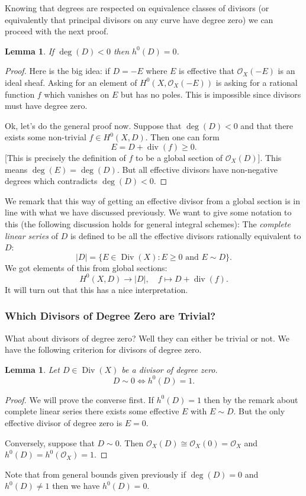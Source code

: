 \documentclass[12pt]{article}
\numberwithin{equation}{section}
\newtheorem{lemma}[theorem]{Lemma}
\theoremstyle{definition}
\theoremstyle{remark}
\newcommand{\Ocal}{\mathcal{O}}
\newcommand{\Div}{\operatorname{Div}}
\renewcommand{\div}{\operatorname{div}}
\begin{document}
Knowing that degrees are respected on equivalence classes of divisors (or equivalently that principal divisors on any curve have degree zero) we can proceed with the next proof. 

\begin{lemma}
	If $\deg(D)<0$ then $h^0(D)=0$. 
\end{lemma}
\begin{proof}
	Here is the big idea: if $D=-E$ where $E$ is effective that $\Ocal_X(-E)$ is an ideal sheaf. 
	Asking for an element of $H^0(X,\Ocal_X(-E))$ is asking for a rational function $f$ which vanishes on $E$ but has no poles. 
	This is impossible since divisors must have degree zero. 
	
	Ok, let's do the general proof now. 
	Suppose that $\deg(D)<0$ and that there exists some non-trivial $f\in H^0(X,D)$. 
	Then one can form 
	 $$ E = D + \div(f) \geq 0.$$
	[This is precisely the definition of $f$ to be a global section of $\Ocal_X(D)$].
	This means $\deg(E) = \deg(D)$. 
	But all effective divisors have non-negative degrees which contradicts $\deg(D)<0$. 
\end{proof}

We remark that this way of getting an effective divisor from a global section is in line with what we have discussed previously. 
We want to give some notation to this (the following discussion holds for general integral schemes):
The \emph{complete linear series} of $D$ is defined to be all the effective divisors rationally equivalent to $D$:
  $$ \vert D \vert = \lbrace E \in \Div(X) \colon E \geq 0 \mbox{ and } E \sim D \rbrace.$$
We got elements of this from global sections:
 $$ H^0(X,D) \to \vert D \vert, \quad f \mapsto D + \div(f). $$
It will turn out that this has a nice interpretation.

\subsubsection{Which Divisors of Degree Zero are Trivial?}
What about divisors of degree zero? Well they can either be trivial or not. 
We have the following criterion for divisors of degree zero. 
\begin{lemma}
	Let $D\in \Div(X)$ be a divisor of degree zero. 
	 $$ D \sim 0 \iff h^0(D) = 1.$$
\end{lemma}
\begin{proof}
	We will prove the converse first. 
	If $h^0(D)=1$ then by the remark about complete linear series there exists some effective $E$ with $E\sim D$. 
	But the only effective divisor of degree zero is $E=0$. 
	
	Conversely, suppose that $D\sim 0$. Then $\Ocal_X(D) \cong \Ocal_X(0) = \Ocal_X$ and $h^0(D) =h^0(\Ocal_X)=1$. 
\end{proof}
	Note that from general bounds given previously if $\deg(D)=0$ and $h^0(D)\neq 1$ then we have $h^0(D)=0$.
	
\end{document}

